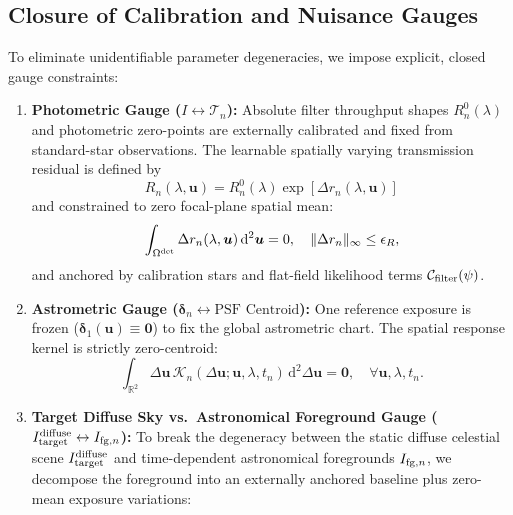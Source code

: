 \documentclass[11pt,a4paper]{article}
\begin{document}
\subsection{Closure of Calibration and Nuisance Gauges}
\label{subsec:gauges}
To eliminate unidentifiable parameter degeneracies, we impose explicit, closed gauge constraints:
\begin{enumerate}
    \item \textbf{Photometric Gauge ($I \leftrightarrow \mathcal{T}_n$):}
    Absolute filter throughput shapes $R_n^0(\lambda)$ and photometric
    zero-points are externally calibrated and fixed from standard-star
    observations.  The learnable spatially varying transmission residual is
    defined by
    \begin{equation}
    R_n(\lambda, \boldsymbol{u})
    = R_n^0(\lambda)\exp\!\left[\Delta r_n(\lambda, \boldsymbol{u})\right]
    \end{equation}
    and constrained to zero focal-plane spatial mean:
    \begin{equation}
    \int_{\Omega^{\rm det}} \Delta r_n(\lambda, \boldsymbol{u}) \, \mathrm{d}^2\boldsymbol{u} = 0, \quad \|\Delta r_n\|_\infty \le \epsilon_R,
    \end{equation}
    and anchored by calibration stars and flat-field likelihood terms $\mathcal{C}_{\rm filter}(\psi)$.
    \item \textbf{Astrometric Gauge ($\boldsymbol{\delta}_n \leftrightarrow \text{PSF Centroid}$):} One reference exposure is frozen ($\boldsymbol{\delta}_1(\boldsymbol{u}) \equiv \mathbf{0}$) to fix the global astrometric chart. The spatial response kernel is strictly zero-centroid:
    \begin{equation}
    \int_{\mathbb{R}^2} \Delta\boldsymbol{u} \, \mathcal{K}_n(\Delta\boldsymbol{u}; \boldsymbol{u}, \lambda, t_n) \, \mathrm{d}^2\Delta\boldsymbol{u} = \mathbf{0}, \quad \forall \boldsymbol{u}, \lambda, t_n.
    \end{equation}
    \item \textbf{Target Diffuse Sky vs.\ Astronomical Foreground Gauge ($I_{\rm target}^{\rm diffuse} \leftrightarrow I_{{\rm fg}, n}$):} To break the degeneracy between the static diffuse celestial scene $I_{\rm target}^{\rm diffuse}$ and time-dependent astronomical foregrounds $I_{{\rm fg}, n}$, we decompose the foreground into an externally anchored baseline plus zero-mean exposure variations:
    \begin{equation}
    \begin{aligned}

\end{aligned}
\end{equation}
\end{enumerate}
\end{document}
